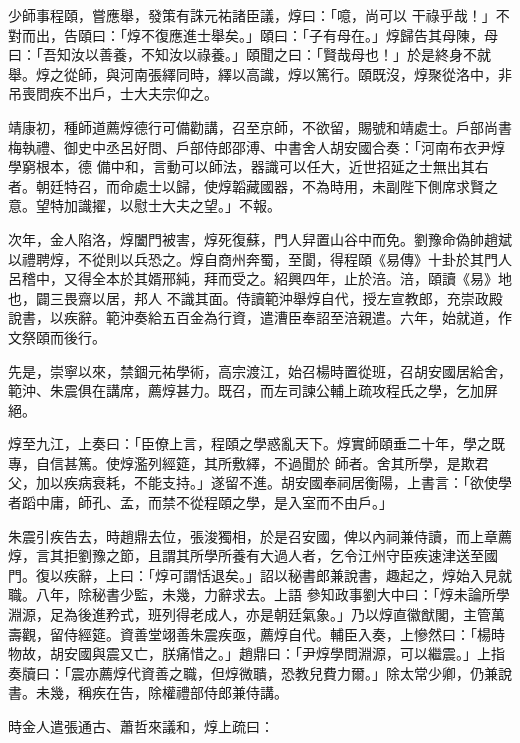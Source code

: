 \begin{pinyinscope}
 少師事程頤，嘗應舉，發策有誅元祐諸臣議，焞曰：「噫，尚可以
 干祿乎哉！」不對而出，告頤曰：「焞不復應進士舉矣。」頤曰：「子有母在。」焞歸告其母陳，母曰：「吾知汝以善養，不知汝以祿養。」頤聞之曰：「賢哉母也！」於是終身不就舉。焞之從師，與河南張繹同時，繹以高識，焞以篤行。頤既沒，焞聚從洛中，非吊喪問疾不出戶，士大夫宗仰之。



 靖康初，種師道薦焞德行可備勸講，召至京師，不欲留，賜號和靖處士。戶部尚書梅執禮、御史中丞呂好問、戶部侍郎邵溥、中書舍人胡安國合奏：「河南布衣尹焞學窮根本，德
 備中和，言動可以師法，器識可以任大，近世招延之士無出其右者。朝廷特召，而命處士以歸，使焞韜藏國器，不為時用，未副陛下側席求賢之意。望特加識擢，以慰士大夫之望。」不報。



 次年，金人陷洛，焞闔門被害，焞死復蘇，門人舁置山谷中而免。劉豫命偽帥趙斌以禮聘焞，不從則以兵恐之。焞自商州奔蜀，至閬，得程頤《易傳》十卦於其門人呂稽中，又得全本於其婿邢純，拜而受之。紹興四年，止於涪。涪，頤讀《易》地也，闢三畏齋以居，邦人
 不識其面。侍讀範沖舉焞自代，授左宣教郎，充崇政殿說書，以疾辭。範沖奏給五百金為行資，遣漕臣奉詔至涪親遣。六年，始就道，作文祭頤而後行。



 先是，崇寧以來，禁錮元祐學術，高宗渡江，始召楊時置從班，召胡安國居給舍，範沖、朱震俱在講席，薦焞甚力。既召，而左司諫公輔上疏攻程氏之學，乞加屏絕。



 焞至九江，上奏曰：「臣僚上言，程頤之學惑亂天下。焞實師頤垂二十年，學之既專，自信甚篤。使焞濫列經筵，其所敷繹，不過聞於
 師者。舍其所學，是欺君父，加以疾病衰耗，不能支持。」遂留不進。胡安國奉祠居衡陽，上書言：「欲使學者蹈中庸，師孔、孟，而禁不從程頤之學，是入室而不由戶。」



 朱震引疾告去，時趙鼎去位，張浚獨相，於是召安國，俾以內祠兼侍讀，而上章薦焞，言其拒劉豫之節，且謂其所學所養有大過人者，乞令江州守臣疾速津送至國門。復以疾辭，上曰：「焞可謂恬退矣。」詔以秘書郎兼說書，趣起之，焞始入見就職。八年，除秘書少監，未幾，力辭求去。上語
 參知政事劉大中曰：「焞未論所學淵源，足為後進矜式，班列得老成人，亦是朝廷氣象。」乃以焞直徽猷閣，主管萬壽觀，留侍經筵。資善堂翊善朱震疾亟，薦焞自代。輔臣入奏，上慘然曰：「楊時物故，胡安國與震又亡，朕痛惜之。」趙鼎曰：「尹焞學問淵源，可以繼震。」上指奏牘曰：「震亦薦焞代資善之職，但焞微聵，恐教兒費力爾。」除太常少卿，仍兼說書。未幾，稱疾在告，除權禮部侍郎兼侍講。



 時金人遣張通古、蕭哲來議和，焞上疏曰：




\end{pinyinscope}
